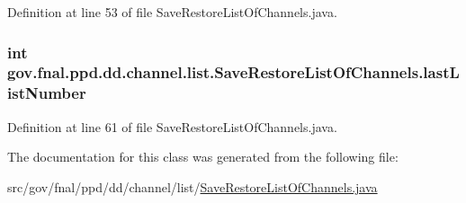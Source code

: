 Definition at line 53 of file Save\-Restore\-List\-Of\-Channels.\-java.

\hypertarget{classgov_1_1fnal_1_1ppd_1_1dd_1_1channel_1_1list_1_1SaveRestoreListOfChannels_a05c358c578a733da611ca47ac0b6fb17}{
\subsubsection[{last\-List\-Number}]{\setlength{\rightskip}{0pt plus 5cm}int gov.\-fnal.\-ppd.\-dd.\-channel.\-list.\-Save\-Restore\-List\-Of\-Channels.\-last\-List\-Number\hspace{0.3cm}{\ttfamily [protected]}}}\label{classgov_1_1fnal_1_1ppd_1_1dd_1_1channel_1_1list_1_1SaveRestoreListOfChannels_a05c358c578a733da611ca47ac0b6fb17}


Definition at line 61 of file Save\-Restore\-List\-Of\-Channels.\-java.



The documentation for this class was generated from the following file\-:\begin{DoxyCompactItemize}
\item 
src/gov/fnal/ppd/dd/channel/list/\hyperlink{SaveRestoreListOfChannels_8java}{Save\-Restore\-List\-Of\-Channels.\-java}\end{DoxyCompactItemize}
